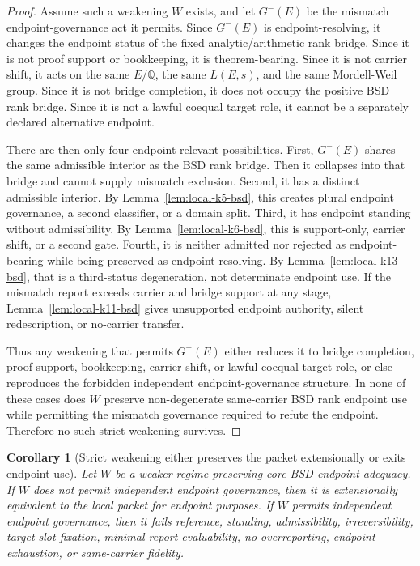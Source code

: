 \documentclass[11pt]{article}
\newtheorem{corollary}[theorem]{Corollary}
\newcommand{\Q}{\mathbb{Q}}
\begin{document}
\begin{proof}
Assume such a weakening $W$ exists, and let $G^{-}(E)$ be the mismatch endpoint-governance act it permits. Since $G^{-}(E)$ is endpoint-resolving, it changes the endpoint status of the fixed analytic/arithmetic rank bridge. Since it is not proof support or bookkeeping, it is theorem-bearing. Since it is not carrier shift, it acts on the same $E/\Q$, the same $L(E,s)$, and the same Mordell-Weil group. Since it is not bridge completion, it does not occupy the positive BSD rank bridge. Since it is not a lawful coequal target role, it cannot be a separately declared alternative endpoint.

There are then only four endpoint-relevant possibilities. First, $G^{-}(E)$ shares the same admissible interior as the BSD rank bridge. Then it collapses into that bridge and cannot supply mismatch exclusion. Second, it has a distinct admissible interior. By Lemma~\ref{lem:local-k5-bsd}, this creates plural endpoint governance, a second classifier, or a domain split. Third, it has endpoint standing without admissibility. By Lemma~\ref{lem:local-k6-bsd}, this is support-only, carrier shift, or a second gate. Fourth, it is neither admitted nor rejected as endpoint-bearing while being preserved as endpoint-resolving. By Lemma~\ref{lem:local-k13-bsd}, that is a third-status degeneration, not determinate endpoint use. If the mismatch report exceeds carrier and bridge support at any stage, Lemma~\ref{lem:local-k11-bsd} gives unsupported endpoint authority, silent redescription, or no-carrier transfer.

Thus any weakening that permits $G^{-}(E)$ either reduces it to bridge completion, proof support, bookkeeping, carrier shift, or lawful coequal target role, or else reproduces the forbidden independent endpoint-governance structure. In none of these cases does $W$ preserve non-degenerate same-carrier BSD rank endpoint use while permitting the mismatch governance required to refute the endpoint. Therefore no such strict weakening survives.
\end{proof}

\begin{corollary}[Strict weakening either preserves the packet extensionally or exits endpoint use]\label{cor:strict-bsd-weakening}
Let $W$ be a weaker regime preserving core BSD endpoint adequacy. If $W$ does not permit independent endpoint governance, then it is extensionally equivalent to the local packet for endpoint purposes. If $W$ permits independent endpoint governance, then it fails reference, standing, admissibility, irreversibility, target-slot fixation, minimal report evaluability, no-overreporting, endpoint exhaustion, or same-carrier fidelity.
\end{corollary}
\end{document}
